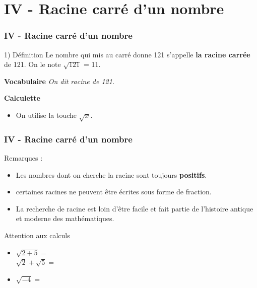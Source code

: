 \documentclass{beamer}
\begin{document}
\section{IV - Racine carré d'un nombre}

\begin{frame}
  \frametitle{IV - Racine carré d'un nombre}

  \begin{block}{1) Définition}
    Le nombre qui mis au carré donne 121 s’appelle \textbf{la racine carrée} de 121. On le note $\sqrt{121}$ = 11.
  \end{block}

  \textbf{Vocabulaire}
  \textit{On dit racine de 121.}

  \textbf{Calculette}
  \begin{itemize}	
  \item On utilise la touche $\sqrt{x}$.
  \end{itemize}
\end{frame}


\begin{frame}
  \frametitle{IV - Racine carré d'un nombre}

  \begin{block}{}
    Remarques : 
    \begin{itemize}
    	\item Les nombres dont on cherche la racine sont toujours \textbf{positifs}.
	\item certaines racines ne peuvent être écrites sous forme de fraction.
    	\item La recherche de racine est loin d'être facile et fait partie de l'histoire antique et moderne des mathématiques.
    \end{itemize} 
  \end{block}

  \begin{alertblock}{Attention aux calculs}
    \begin{itemize}
    \item $\sqrt{2 + 5} = $\\
      $\sqrt{2} + \sqrt{5}= $

    \item $\sqrt{-4} = $\\

    \end{itemize}
  \end{alertblock}
\end{frame}
\end{document}
